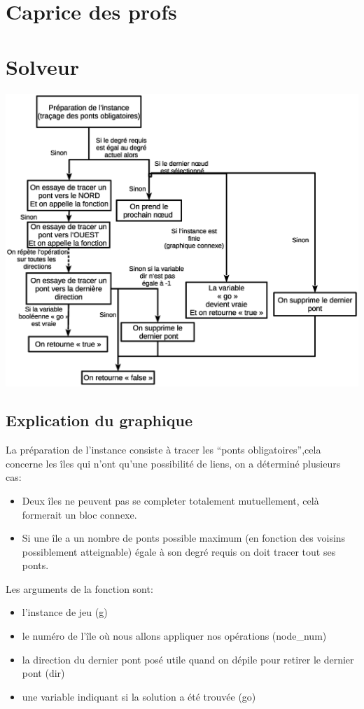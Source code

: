 \documentclass[12pt]{report}
\begin{document}
\chapter{Caprice des profs}

\chapter{Solveur}
\includegraphics[width = 1.00\textwidth]{explication_solveur.eps}
\section{Explication du graphique}

La préparation de l'instance consiste à tracer les ``ponts obligatoires'',cela concerne les îles qui n'ont qu'une possibilité de liens,
on a déterminé plusieurs cas:
\begin{itemize}
\item Deux îles ne peuvent pas se completer totalement mutuellement, celà formerait un bloc connexe.
\item Si une île a un nombre de ponts possible maximum (en fonction des voisins possiblement atteignable) égale à son degré requis on doit tracer tout ses ponts.
\end{itemize}

Les arguments de la fonction sont:
\begin{itemize}
\item l'instance de jeu (g)
\item le numéro de l'île où nous allons appliquer nos opérations (node\_num)
\item la direction du dernier pont posé utile quand on dépile pour retirer le dernier pont (dir)
\item une variable indiquant si la solution a été trouvée (go)
\end{itemize}
\end{document}
